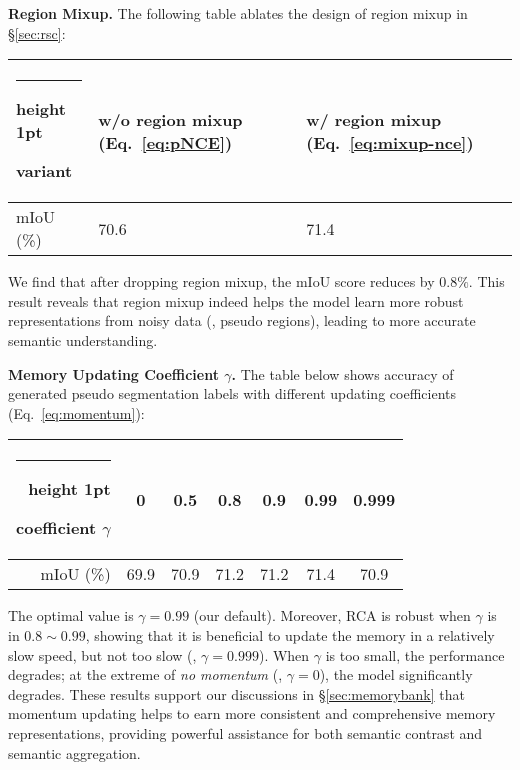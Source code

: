 \documentclass[10pt,twocolumn,letterpaper]{article}
\makeatletter
\newcommand{\thickhline}{\noalign {\ifnum 0=`}\fi \hrule height 1pt
	\futurelet \reserved@a \@xhline
}
\newcommand{\tablestyle}[2]{\setlength{\tabcolsep}{#1}\renewcommand{\arraystretch}{#2}\centering\footnotesize}
\makeatother
\begin{document}
\noindent\textbf{Region Mixup.} The following table ablates the design of region mixup in \S\ref{sec:rsc}:
\vspace{-6pt}
\begin{table}[H]
	\small
	\centering	
		\tablestyle{1pt}{1.05}
		\begin{tabular}{|z{40}|x{90}x{90}|}
			\thickhline
variant 
			& {w/o} region mixup (Eq.~\ref{eq:pNCE}) & {w/} region mixup (Eq.~\ref{eq:mixup-nce})  \\ \hline		 
			mIoU (\%)           						 
			& 70.6 & 71.4  \\ \hline		 
	\end{tabular}
	\vspace{-10pt}
\end{table}
\noindent We find that after dropping region mixup, the mIoU score reduces by $0.8\%$. This result reveals that region mixup  indeed helps the model learn more robust representations from noisy data (\ie, pseudo regions), leading to more accurate semantic understanding.

\noindent\textbf{Memory Updating Coefficient $\gamma$.} The table below shows accuracy of generated pseudo segmentation labels with different updating coefficients (Eq.~\ref{eq:momentum}):
\vspace{-6pt}
\begin{table}[H]
	\small
	\centering	
		\tablestyle{7pt}{1.05}
		\begin{tabular}{|r|cccccc|}
			\thickhline
coefficient $\gamma$                                   
			& 0  & 0.5 & 0.8 & 0.9 & 0.99 & 0.999\\ \hline		 
			mIoU (\%)           						 
			& 69.9 & 70.9 & 71.2 & 71.2 & 71.4 & 70.9 \\ \hline		 
	\end{tabular}
	\vspace{-10pt}
\end{table}
\noindent The optimal value is $\gamma\!=\!0.99$ (our default). Moreover, RCA is robust when $\gamma$ is in $0.8\!\sim\!0.99$, showing that it is beneficial to update the memory in a relatively slow speed, but not too slow (\ie, $\gamma\!=\!0.999$). When $\gamma$ is too small, the performance degrades; at the extreme of \emph{no momentum} (\ie, $\gamma\!=\!0$), the model significantly  degrades. These results support our discussions in \S\ref{sec:memorybank} that momentum updating helps to earn more consistent and comprehensive memory representations, providing powerful assistance for both semantic contrast and semantic aggregation.
\end{document}
